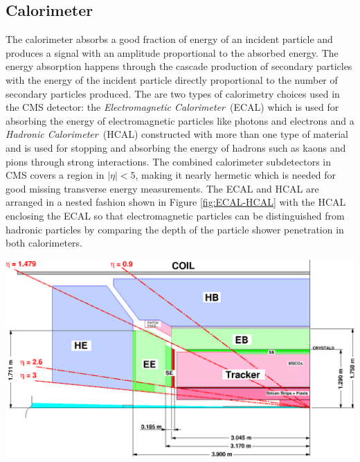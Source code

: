 \subsection{Calorimeter}
The calorimeter absorbs a good fraction of energy of an incident particle and produces a signal with an amplitude proportional to the absorbed energy. The energy absorption happens through the cascade production of secondary particles with the energy of the incident particle directly proportional to the number of secondary particles produced. The are two types of calorimetry choices used in the CMS detector: the \textit{Electromagnetic Calorimeter}~(ECAL) which is used for absorbing the energy of electromagnetic particles like photons and electrons and a \textit{Hadronic Calorimeter}~(HCAL) constructed with more than one type of material and is used for stopping and absorbing the energy of hadrons such as kaons and pions through strong interactions. The combined calorimeter subdetectors in CMS covers a region in $|\eta| < 5$, making it nearly hermetic which is needed for good missing transverse energy measurements. The ECAL and HCAL are arranged in a nested fashion shown in Figure \ref{fig:ECAL-HCAL} with the HCAL enclosing the ECAL so that electromagnetic particles can be distinguished from hadronic particles by comparing the depth of the particle shower penetration in both calorimeters.

\begin{center}
\centering
\mbox{\includegraphics[scale=0.5]{THESISPLOTS/ECAL-HCAL.eps}} 
\label{fig:ECAL-HCAL}
\end{center}

